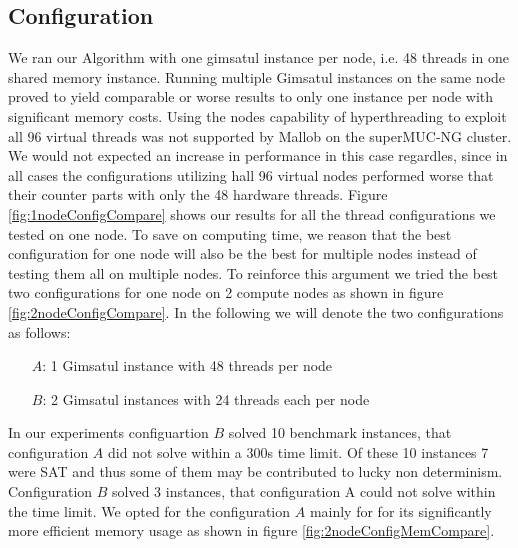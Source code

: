 \documentclass[12pt,a4paper,twoside]{scrartcl}
\numberwithin{equation}{section}
\begin{document}
\subsection{Configuration}
We ran our Algorithm with one gimsatul instance per node, i.e. 48 threads in one shared memory instance. Running multiple Gimsatul instances on the same node proved to yield comparable or worse results to only one instance per node with significant memory costs. Using the nodes capability of hyperthreading to exploit all 96 virtual threads was not supported by Mallob on the superMUC-NG cluster. We would not expected an increase in performance in this case regardles, since in all cases the configurations utilizing hall 96 virtual nodes performed worse that their counter parts with only the 48 hardware threads. Figure \ref{fig:1nodeConfigCompare} shows our results for all the thread configurations we tested on one node. To save on computing time, we reason that the best configuration for one node will also be the best for multiple nodes instead of testing them all on multiple nodes. To reinforce this argument we tried the best two configurations for one node on 2 compute nodes as shown in figure \ref{fig:2nodeConfigCompare}. In the following we will denote the two configurations as follows:
\begin{itemize}
  \item[$A$:] 1 Gimsatul instance with 48 threads per node
  \item[$B$:] 2 Gimsatul instances with 24 threads each per node
\end{itemize}
In our experiments configuartion $B$ solved 10 benchmark instances, that configuration $A$ did not solve within a 300s time limit. Of these 10 instances 7 were SAT and thus some of them may be contributed to lucky non determinism. Configuration $B$ solved 3 instances, that configuration A could not solve within the time limit. We opted for the configuration $A$ mainly for for its significantly more efficient memory usage as shown in figure \ref{fig:2nodeConfigMemCompare}.
\end{document}
